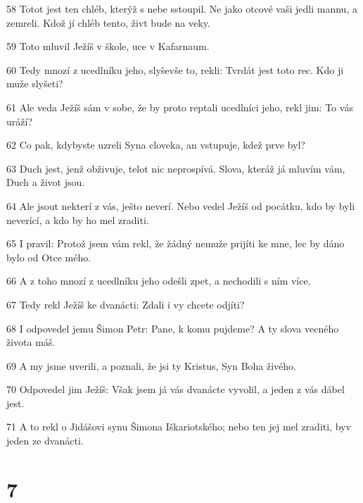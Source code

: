 \par 58 Totot jest ten chléb, kterýž s nebe sstoupil. Ne jako otcové vaši jedli mannu, a zemreli. Kdož jí chléb tento, živt bude na veky.
\par 59 Toto mluvil Ježíš v škole, uce v Kafarnaum.
\par 60 Tedy mnozí z ucedlníku jeho, slyševše to, rekli: Tvrdát jest toto rec. Kdo ji muže slyšeti?
\par 61 Ale veda Ježíš sám v sobe, že by proto reptali ucedlníci jeho, rekl jim: To vás uráží?
\par 62 Co pak, kdybyste uzreli Syna cloveka, an vstupuje, kdež prve byl?
\par 63 Duch jest, jenž obživuje, telot nic neprospívá. Slova, kteráž já mluvím vám, Duch a život jsou.
\par 64 Ale jsout nekterí z vás, ješto neverí. Nebo vedel Ježíš od pocátku, kdo by byli neverící, a kdo by ho mel zraditi.
\par 65 I pravil: Protož jsem vám rekl, že žádný nemuže prijíti ke mne, lec by dáno bylo od Otce mého.
\par 66 A z toho mnozí z ucedlníku jeho odešli zpet, a nechodili s ním více.
\par 67 Tedy rekl Ježíš ke dvanácti: Zdali i vy chcete odjíti?
\par 68 I odpovedel jemu Šimon Petr: Pane, k komu pujdeme? A ty slova vecného života máš.
\par 69 A my jsme uverili, a poznali, že jsi ty Kristus, Syn Boha živého.
\par 70 Odpovedel jim Ježíš: Však jsem já vás dvanácte vyvolil, a jeden z vás dábel jest.
\par 71 A to rekl o Jidášovi synu Šimona Iškariotského; nebo ten jej mel zraditi, byv jeden ze dvanácti.

\chapter{7}

